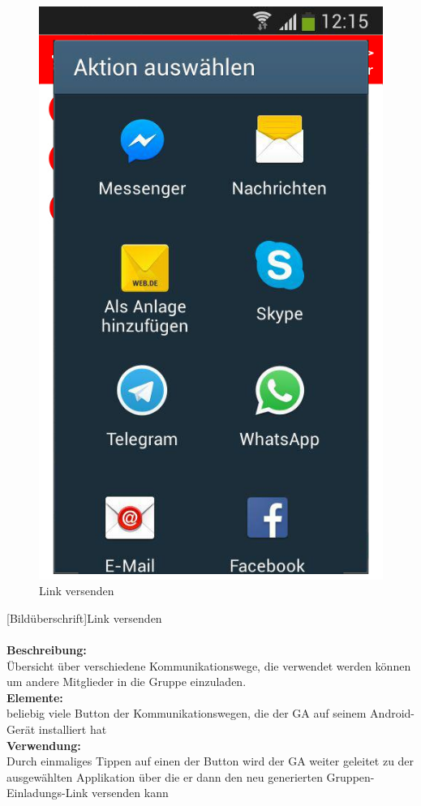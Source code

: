 \begin{figure} [H]
	\caption{Link versenden}
\begin{center}
	\includegraphics[scale =0.5]{resources/images/link_versenden.png}
\end{center}
\end{figure}
[Bildüberschrift]Link versenden\\ \\
\textbf{Beschreibung:}\\
Übersicht über verschiedene Kommunikationswege, die verwendet werden können um andere Mitglieder in die Gruppe einzuladen.\\
\textbf{Elemente:}\\
beliebig viele Button der Kommunikationswegen, die der GA auf seinem Android-Gerät installiert hat\\
\textbf{Verwendung:}\\
Durch einmaliges Tippen auf einen der Button wird der GA weiter geleitet zu der ausgewählten Applikation über die er dann den neu generierten Gruppen-Einladungs-Link versenden kann\\ \\

